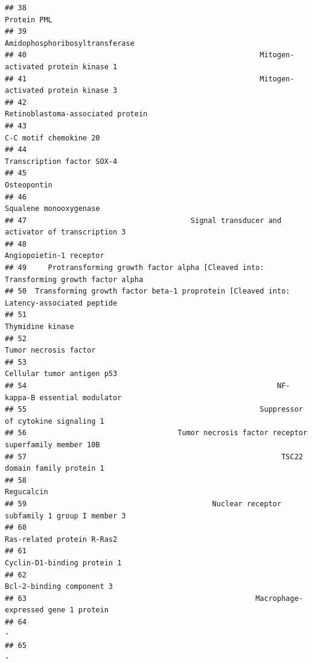 \documentclass[
]{article}
\begin{document}
\begin{verbatim}
## 38                                                                             Protein PML 
## 39                                                          Amidophosphoribosyltransferase 
## 40                                                      Mitogen-activated protein kinase 1 
## 41                                                      Mitogen-activated protein kinase 3 
## 42                                                       Retinoblastoma-associated protein 
## 43                                                                  C-C motif chemokine 20 
## 44                                                               Transcription factor SOX-4
## 45                                                                             Osteopontin 
## 46                                                                  Squalene monooxygenase 
## 47                                      Signal transducer and activator of transcription 3 
## 48                                                                 Angiopoietin-1 receptor 
## 49     Protransforming growth factor alpha [Cleaved into: Transforming growth factor alpha 
## 50  Transforming growth factor beta-1 proprotein [Cleaved into: Latency-associated peptide 
## 51                                                                         Thymidine kinase
## 52                                                                   Tumor necrosis factor 
## 53                                                              Cellular tumor antigen p53 
## 54                                                          NF-kappa-B essential modulator 
## 55                                                      Suppressor of cytokine signaling 1 
## 56                                   Tumor necrosis factor receptor superfamily member 10B 
## 57                                                           TSC22 domain family protein 1 
## 58                                                                              Regucalcin 
## 59                                           Nuclear receptor subfamily 1 group I member 3 
## 60                                                              Ras-related protein R-Ras2 
## 61                                                             Cyclin-D1-binding protein 1 
## 62                                                                Bcl-2-binding component 3
## 63                                                     Macrophage-expressed gene 1 protein 
## 64                                                                                        -
## 65                                                                                        -

\end{verbatim}
\end{document}
